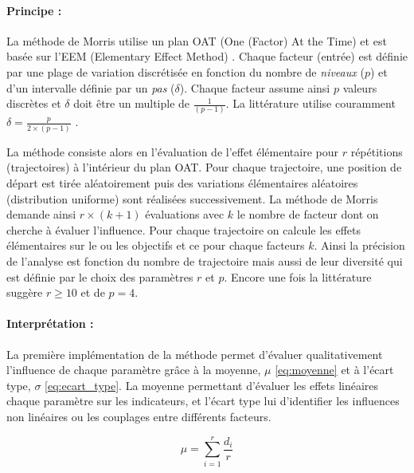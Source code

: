 \paragraph{Principe :} %
\label{par:principe}
La méthode de Morris utilise un plan OAT (One (Factor) At the Time) et est basée sur
l’EEM (Elementary Effect Method) \parencite{Saltelli2004}.
Chaque facteur (entrée) est définie par une plage de variation discrétisée en fonction
du nombre de \emph{niveaux} ($p$) et d’un intervalle définie par un \emph{pas} ($\delta$).
Chaque facteur assume ainsi $p$ valeurs discrètes et $\delta$ doit être un multiple de
$\frac{1}{(p - 1)}$. La littérature utilise couramment $\delta = \frac{p}{2 \times (p - 1)}$
\parencite{Morris1991161, Campolongo20071509}.

La méthode consiste alors en l’évaluation de l’effet élémentaire pour $r$ répétitions
(trajectoires) à l’intérieur du plan OAT. Pour chaque trajectoire, une position de départ
est tirée aléatoirement puis des variations élémentaires aléatoires (distribution uniforme)
sont réalisées successivement. La méthode de Morris demande ainsi $r \times (k + 1)$ évaluations
avec $k$ le nombre de facteur dont on cherche à évaluer l’influence. Pour chaque trajectoire
on calcule les effets élémentaires sur le ou les objectifs et ce pour chaque facteurs $k$.
Ainsi la précision de l’analyse est fonction du nombre de trajectoire mais aussi
de leur diversité qui est définie par le choix des paramètres $r$ et $p$.
Encore une fois la littérature suggère $r \geq 10$ et de $p = 4$.



\paragraph{Interprétation :} %
\label{par:interpretation}
La première implémentation de la méthode permet d’évaluer qualitativement l’influence de chaque
paramètre grâce à la moyenne, $\mu$ \eqref{eq:moyenne} et à l’écart type, $\sigma$ \eqref{eq:ecart_type}.
La moyenne permettant d’évaluer les effets linéaires chaque paramètre sur les indicateurs,
et l’écart type lui d’identifier les influences non linéaires ou les couplages entre différents facteurs.

\begin{equation}\label{eq:moyenne}
    \mu = \sum_{i = 1}^{r} \frac{d_{i}}{r}
\end{equation}

